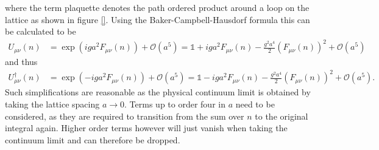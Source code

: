 where the term plaquette denotes the path ordered product around a loop on the lattice as shown in figure \ref{}. Using the Baker-Campbell-Hausdorf formula this can be calculated to be
\begin{align*}
 U_{\mu \nu}(n) & = \exp \left( iga^2 F_{\mu \nu} (n) \right) + \mathcal{O}(a^5) = \mathbb{1} + i g a^2 F_{\mu \nu} (n) - \frac{g^2 a^4}{2} (F_{\mu \nu} (n))^2 + \mathcal{O}(a^5)
\end{align*}
and thus
\begin{align*}
 U_{\mu \nu}^\dagger(n) & = \exp \left( - iga^2 F_{\mu \nu} (n) \right) + \mathcal{O}(a^5) = \mathbb{1} - i g a^2 F_{\mu \nu} (n) - \frac{g^2 a^4}{2} (F_{\mu \nu} (n) )^2 + \mathcal{O}(a^5) \textrm{.}
\end{align*}
Such simplifications are reasonable as the physical continuum limit is obtained by taking the lattice spacing $a \rightarrow 0$. Terms up to order four in $a$ need to be considered, as they are required to transition from the sum over $n$ to the original integral again. Higher order terms however will just vanish when taking the continuum limit and can therefore be dropped.

